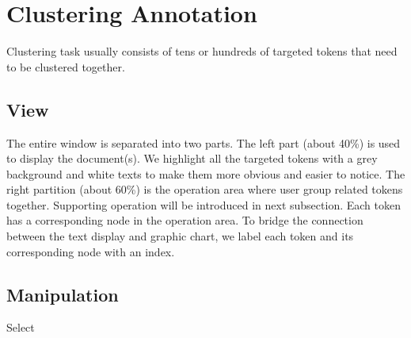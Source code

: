 \section{Clustering Annotation}

Clustering task usually consists of tens or hundreds of targeted tokens that need to be clustered together. 

\subsection{View}

The entire window is separated into two parts. The left part (about 40\%) is used to display the document(s). We highlight all the targeted tokens with a grey background and white texts to make them more obvious and easier to notice. The right partition (about 60\%) is the operation area where user group related tokens together. Supporting operation will be introduced in next subsection. Each token has a corresponding node in the operation area. To bridge the connection between the text display and graphic chart, we label each token and its corresponding node with an index.

\subsection{Manipulation}

Select 